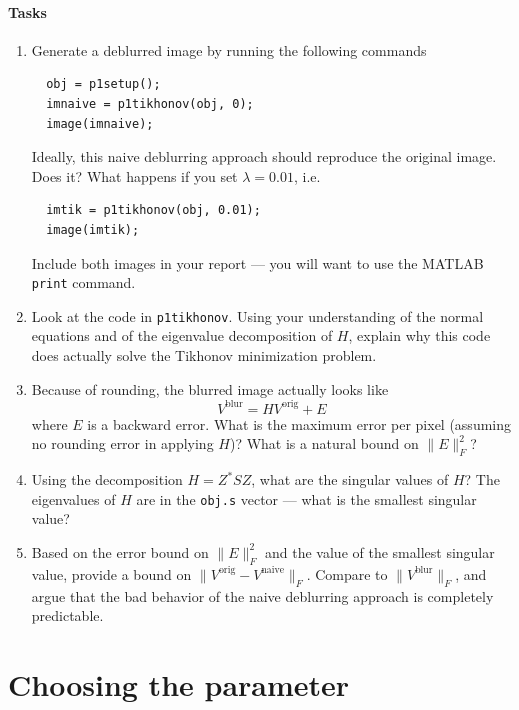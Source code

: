 \documentclass[12pt, leqno]{article} %
\begin{document}
\paragraph*{Tasks}
\begin{enumerate}
\item
  Generate a deblurred image by running the following commands
\begin{lstlisting}
  obj = p1setup();
  imnaive = p1tikhonov(obj, 0);
  image(imnaive);
\end{lstlisting}
  Ideally, this naive deblurring approach should reproduce the
  original image.  Does it?  What happens if you set $\lambda = 0.01$,
  i.e.
\begin{lstlisting}
  imtik = p1tikhonov(obj, 0.01);
  image(imtik);
\end{lstlisting}
  Include both images in your report --- you will want to use the
  MATLAB {\tt print} command.

\item
  Look at the code in {\tt p1tikhonov}.  Using your understanding
  of the normal equations and of the eigenvalue decomposition of $H$,
  explain why this code does actually solve the Tikhonov minimization
  problem.

\item
  Because of rounding, the blurred image actually looks like
  \[
    V^{\mathrm{blur}} = HV^{\mathrm{orig}} + E
  \]
  where $E$ is a backward error.  What is the maximum error per pixel
  (assuming no rounding error in applying $H$)?  What is a natural
  bound on $\|E\|_F^2$?

\item
  Using the decomposition $H = Z^* S Z$, what are the singular values
  of $H$?
  The eigenvalues of $H$ are in the {\tt obj.s} vector --- what is the
  smallest singular value?

\item
  Based on the
  error bound on $\|E\|_F^2$ and the value of the smallest singular
  value, provide a bound on $\|V^{\mathrm{orig}}-V^{\mathrm{naive}}\|_F$.
  Compare to $\|V^{\mathrm{blur}}\|_F$, and
  argue that the bad behavior of the naive deblurring approach is
  completely predictable.

\end{enumerate}

\section{Choosing the parameter}
\end{document}
